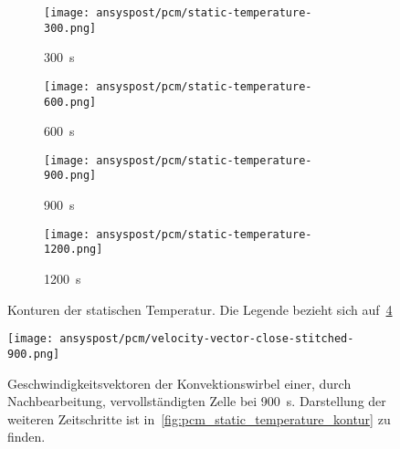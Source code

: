\begin{figure}[H]
\begin{minipage}[t]{0.485\textwidth}
\begin{subfigure}[t]{0.16\textwidth}
        \end{subfigure}%
        \hspace{2mm}%
        \begin{subfigure}[t]{0.2\textwidth}
            \centering
            \texttt{[image: ansyspost/pcm/static-temperature-300.png]}
            \caption{\SI{300}{\second}}\label{fig:temperatur_300}
        \end{subfigure}%
        \begin{subfigure}[t]{0.2\textwidth}
            \centering
            \texttt{[image: ansyspost/pcm/static-temperature-600.png]}
            \caption{\SI{600}{\second}}\label{fig:temperatur_600}
        \end{subfigure}%
        \begin{subfigure}[t]{0.2\textwidth}
            \centering
            \texttt{[image: ansyspost/pcm/static-temperature-900.png]}
            \caption{\SI{900}{\second}}\label{fig:temperatur_900}
        \end{subfigure}%
        \begin{subfigure}[t]{0.2\textwidth}
            \centering
            \texttt{[image: ansyspost/pcm/static-temperature-1200.png]}
            \caption{\SI{1200}{\second}}\label{fig:temperatur_1200}
        \end{subfigure}
        \caption{Konturen der statischen Temperatur. Die Legende bezieht sich auf~\ref{fig:temperatur_1200}}
        \label{fig:static_temperature_kontur}
    \end{minipage}

\end{figure}

\begin{figure}[H]
  \centering
  \texttt{[image: ansyspost/pcm/velocity-vector-close-stitched-900.png]}
  \caption{Geschwindigkeitsvektoren der Konvektionswirbel einer, durch Nachbearbeitung, vervollständigten Zelle
  bei \SI{900}{\second}. Darstellung der weiteren Zeitschritte ist in~\ref{fig:pcm_static_temperature_kontur} zu finden.}\label{fig:pcm_vectoren_stitched}
\end{figure}